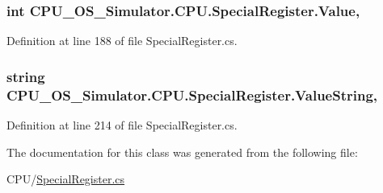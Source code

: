 \subsubsection[{Value}]{\setlength{\rightskip}{0pt plus 5cm}int C\+P\+U\+\_\+\+O\+S\+\_\+\+Simulator.\+C\+P\+U.\+Special\+Register.\+Value\hspace{0.3cm}{\ttfamily [get]}, {\ttfamily [set]}}\label{class_c_p_u___o_s___simulator_1_1_c_p_u_1_1_special_register_aeff33618d376eeaef1e62d6833074bd4}


Definition at line 188 of file Special\+Register.\+cs.

\hypertarget{class_c_p_u___o_s___simulator_1_1_c_p_u_1_1_special_register_a60a2bcd516cedf8bb485c2e36bbc3235}{}
\subsubsection[{Value\+String}]{\setlength{\rightskip}{0pt plus 5cm}string C\+P\+U\+\_\+\+O\+S\+\_\+\+Simulator.\+C\+P\+U.\+Special\+Register.\+Value\+String\hspace{0.3cm}{\ttfamily [get]}, {\ttfamily [set]}}\label{class_c_p_u___o_s___simulator_1_1_c_p_u_1_1_special_register_a60a2bcd516cedf8bb485c2e36bbc3235}


Definition at line 214 of file Special\+Register.\+cs.



The documentation for this class was generated from the following file\+:\begin{DoxyCompactItemize}
\item 
C\+P\+U/\hyperlink{_special_register_8cs}{Special\+Register.\+cs}\end{DoxyCompactItemize}
